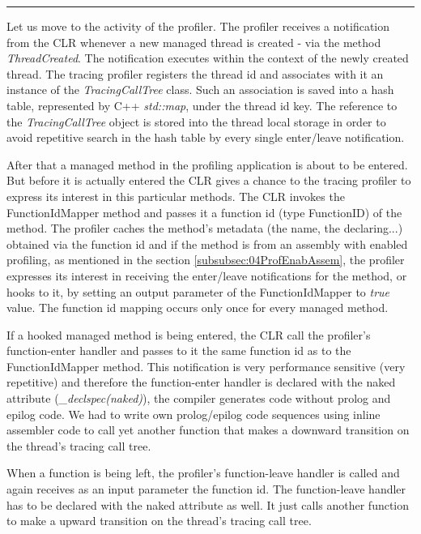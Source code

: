\begin{center}
\rule{300pt}{1.5pt}
\end{center}
Let us move to the activity of the profiler. The profiler receives a notification from the CLR whenever a new managed thread is created - via the method \textit{ThreadCreated}. The notification executes within the context of the newly created thread. The tracing profiler registers the thread id and associates with it an instance of the \textit{TracingCallTree} class. Such an association is saved into a hash table, represented by C++ \textit{std::map}, under the thread id key. The reference to the \textit{TracingCallTree} object is stored into the thread local storage in order to avoid repetitive search in the hash table by every single enter/leave notification.

After that a managed method in the profiling application is about to be entered. But before it is actually entered the CLR gives a chance to the tracing profiler to express its interest in this particular methods. The CLR invokes the FunctionIdMapper method and passes it a function id (type FunctionID) of the method. The profiler caches the method's metadata (the name, the declaring...) obtained via the function id and if the method is from an assembly with enabled profiling, as mentioned in the section \ref{subsubsec:04ProfEnabAssem}, the profiler expresses its interest in receiving the enter/leave notifications for the method,  or hooks to it, by setting an output parameter of the FunctionIdMapper to \textit{true} value. The function id mapping occurs only once for every managed method.

If a hooked managed method is being entered, the CLR call the profiler's function-enter handler and passes to it the same function id as to the FunctionIdMapper method. This notification is very performance sensitive (very repetitive) and therefore the function-enter handler is declared with the naked attribute (\textit{\_declspec(naked)}), the compiler generates code without prolog and epilog code. We had to write own prolog/epilog code sequences using inline assembler code to call yet another function that makes a downward transition on the thread's tracing call tree.

When a function is being left, the profiler's function-leave handler is called and again receives as an input parameter the function id. The function-leave handler has to be declared with the naked attribute as well. It just calls another function to make a upward transition on the thread's tracing call tree.

